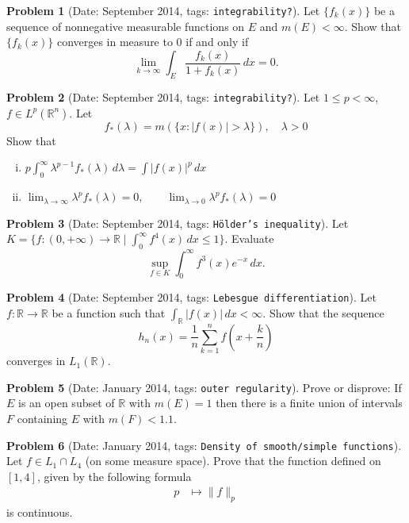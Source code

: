 \documentclass[11pt, notitlepage]{article}
\theoremstyle{definition}
\theoremstyle{definition}
\theoremstyle{definition}
\newtheorem{probstate}{Problem}
\theoremstyle{remark}
\newenvironment{problem}[2]{
    \begin{probstate}[Date: #1, tags: \texttt{#2}]
}
{
  \end{probstate}
}
\newcommand{\R}{\mathbb{R}}
\begin{document}
\begin{problem}{September 2014}{integrability?}
Let $\{f_k(x)\}$ be a sequence of nonnegative measurable functions on $E$ and $m(E)<\infty$. Show that $\{f_k(x)\}$ converges in measure to $0$ if and only if 
$$\lim_{k\to\infty}\int_E\frac{f_k(x)}{1+f_k(x)}\,dx=0.$$
\end{problem}

\begin{problem}{September 2014}{integrability?}
Let $1\le p<\infty$, $f\in L^p(\mathbb R^n)$. Let
$$f_*(\lambda)=m(\{x: |f(x)|>\lambda\}), \quad \lambda>0$$
Show that 

\begin{enumerate}[(i)]
\item$p\int_0^\infty \lambda^{p-1} f_*(\lambda)\,d\lambda= \int |f(x)|^p\,dx$
\item  $\lim_{\lambda\to\infty}\lambda^p f_*(\lambda)=0,\qquad \lim_{\lambda\to 0}\lambda^p f_*(\lambda)=0$
\end{enumerate}
\end{problem}

\begin{problem}{September 2014}{H\"older's inequality}
Let $K=\{f :(0,+\infty) \to \R \mid \int_0^{\infty} f^4(x) \, dx \le 1  \}$. Evaluate
\[
  \sup_{f \in K} \int_0^\infty f^3(x) e^{-x}  \, dx.
\]
\end{problem}

\begin{problem}{September 2014}{Lebesgue differentiation}
Let  $f: \R \to \R$ be a function such that $\int_{\R} |f(x)| \, dx < \infty$. Show that the sequence
\[
 h_n(x)=\frac{1}{n} \sum_{k=1}^n f \left(x+ \frac{k}{n} \right)
\]
converges in $L_1(\R)$.
\end{problem}

\begin{problem}{January 2014}{outer regularity}
Prove or disprove:  If $E$ is an open subset of $\R$ with $m(E)=1$ then there is a finite union of intervals $F$ containing $E$ with $m(F)<1.1$.
\end{problem}

\begin{problem}{January 2014}{Density of smooth/simple functions}
Let $f\in L_1\cap L_4$ (on some measure space).  Prove that the function defined on $[1,4]$, given by the following formula
\begin{align*}
p & \mapsto \|f\|_p
\end{align*}
 is continuous.
\end{problem}
\end{document}
